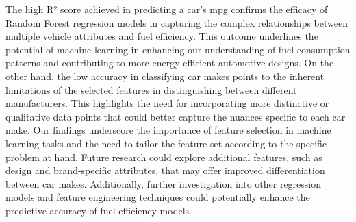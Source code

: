 \documentclass[a4paper, twocolumn]{article}
\begin{document}
The high R² score achieved in predicting a car's mpg confirms the efficacy of Random Forest regression models in capturing the complex relationships between multiple vehicle attributes and fuel efficiency. This outcome underlines the potential of machine learning in enhancing our understanding of fuel consumption patterns and contributing to more energy-efficient automotive designs.
On the other hand, the low accuracy in classifying car makes points to the inherent limitations of the selected features in distinguishing between different manufacturers. This highlights the need for incorporating more distinctive or qualitative data points that could better capture the nuances specific to each car make.
Our findings underscore the importance of feature selection in machine learning tasks and the need to tailor the feature set according to the specific problem at hand. Future research could explore additional features, such as design and brand-specific attributes, that may offer improved differentiation between car makes. Additionally, further investigation into other regression models and feature engineering techniques could potentially enhance the predictive accuracy of fuel efficiency models.
\end{document}
